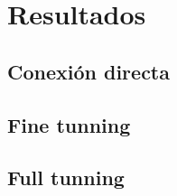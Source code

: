 \section{Resultados}

\subsection{Conexión directa}

\subsection{Fine tunning}

\subsection{Full tunning}